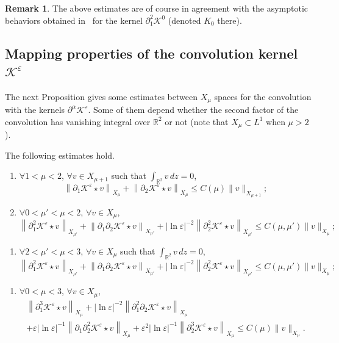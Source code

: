 \documentclass[10pt]{amsart}
\theoremstyle{definition}\newtheorem{defi}[theo]{Definition}\newtheorem{rema}[theo]{Remark}\newtheorem{exam}[theo]{Example}\newtheorem{exem}[theo]{Example}\newtheorem{nota}[theo]{Notation}
\newcommand*\p{\partial}
\newcommand*\R{\mathbb R}
\newcommand*\BK{\mathcal{K}}
\newcommand*\ls{\leqslant }
\newcommand*\e{\varepsilon}
\newcommand*{\relabel}{\renewcommand{\labelenumi}{(\theenumi)}}
\newcommand*{\romanenumi}{\renewcommand*{\theenumi}{\roman{enumi}}}
\newcommand*{\romenumi}{\renewcommand*{\theenumi}{\roman{enumi}'}\relabel}
\let\oldforall\forall
\renewcommand*{\forall}{\mathrel{\oldforall}}
\begin{document}
\begin{rema}
The above estimates are of course in agreement with the asymptotic behaviors obtained in~\cite{Gravos} for the kernel $ \p_1^2 \BK^0 $ (denoted $ K_0 $ there).
\end{rema}



\subsection{Mapping properties of the convolution kernel \texorpdfstring{$ \BK^\e $}{BK e }}

The next Proposition gives some estimates between $ X_\mu $ spaces for the convolution with the kernels $ \p^\alpha \BK^\e $. Some of them depend whether the second factor of the convolution has vanishing integral over $ \R^2 $ or not (note that $ X_\mu \subset L^1 $ when $ \mu > 2 $).

\begin{prop}\label{mapp}
The following estimates hold.
\begin{enumerate}\romanenumi
\item\label{prop2.6.1} $ \forall 1 < \mu < 2 $, $ \forall v \in X_{\mu +1 } $ such that $ \int_{\R^2} v \, dz = 0 $,
\[
\left\| \p_1 \BK^\e \star v \right\|_{ X_\mu} + \left\| \p_2 \BK^\e \star v \right\|_{X_\mu}
\ls C(\mu) \| v \|_{X_{\mu+1 }} ;
\]
\item\label{prop2.6.2} $ \forall 0 < \mu' <\mu < 2 $, $\forall v \in X_{\mu } $,
\[
\left\| \p_1^2 \BK^\e \star v \right\|_{ X_{\mu'}} + \left\| \p_1 \p_2 \BK^\e \star v \right\|_{X_{\mu'}} + \lvert \ln \e\rvert^{-2} \left\| \p_2^2 \BK^\e \star v \right\|_{X_{\mu'}}
\ls C(\mu, \mu') \| v \|_{X_{\mu} } ;
\]
\end{enumerate}
\begin{enumerate}\romenumi
\setcounter{enumi}{1}
\item\label{prop2.6.2'} $ \forall 2 < \mu' < \mu < 3 $, $ \forall v \in X_{\mu } $ such that $ \int_{\R^2} v \, dz = 0 $,
\[
\left\| \p_1^2 \BK^\e \star v \right\|_{ X_{\mu'}} + \left\| \p_1 \p_2 \BK^\e \star v \right\|_{X_{\mu'}} + \lvert \ln \e\rvert^{-2} \left\| \p_2^2 \BK^\e \star v \right\|_{X_{\mu'}}
\ls C(\mu, \mu') \| v \|_{X_{\mu} } ;
\]
\end{enumerate}
\begin{enumerate}\romanenumi
\setcounter{enumi}{2}
\item\label{prop2.6.3} $ \forall 0 < \mu < 3 $, $ \forall v \in X_{\mu } $,
\begin{multline*}
 \left\|
\p_1^3 \BK^\e \star v \right\|_{ X_{\mu}} + \lvert \ln \e\rvert^{-2} \left\| \p_1^2 \p_2 \BK^\e \star v \right\|_{X_{\mu}}
\\
+ \e \lvert \ln \e\rvert^{-1} \left\| \p_1 \p_2^2 \BK^\e \star v \right\|_{X_{\mu}} + \e^2 \lvert \ln \e\rvert^{-1} \left\| \p_2^3 \BK^\e \star v \right\|_{X_{\mu}}
\ls C(\mu) \| v \|_{ X_{\mu} }.
\end{multline*}
\end{enumerate}
\end{prop}
\end{document}
